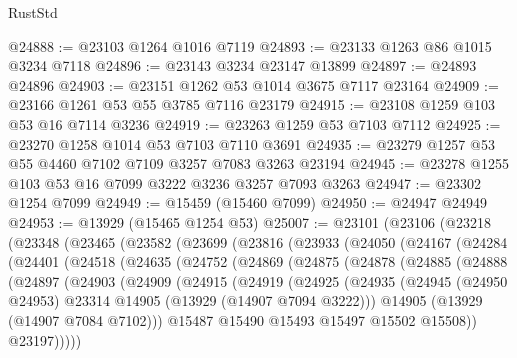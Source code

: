 \begin{lexlean}{RustStd}
\begin{coremodule}
@24888 := @23103 @1264 @1016 @7119
@24893 := @23133 @1263 @86 @1015 @3234 @7118
@24896 := @23143 @3234 @23147 @13899
@24897 := @24893 @24896
@24903 := @23151 @1262 @53 @1014 @3675 @7117 @23164
@24909 := @23166 @1261 @53 @55 @3785 @7116 @23179
@24915 := @23108 @1259 @103 @53 @16 @7114 @3236
@24919 := @23263 @1259 @53 @7103 @7112
@24925 := @23270 @1258 @1014 @53 @7103 @7110 @3691
@24935 := @23279 @1257 @53 @55 @4460 @7102 @7109 @3257 @7083 @3263 @23194
@24945 := @23278 @1255 @103 @53 @16 @7099 @3222 @3236 @3257 @7093 @3263
@24947 := @23302 @1254 @7099
@24949 := @15459 (@15460 @7099)
@24950 := @24947 @24949
@24953 := @13929 (@15465 @1254 @53)
@25007 := @23101
    (@23106
      (@23218
        (@23348
          (@23465
            (@23582
              (@23699
                (@23816
                  (@23933
                    (@24050
                      (@24167
                        (@24284
                          (@24401
                            (@24518
                              (@24635
                                (@24752
                                  (@24869
                                    (@24875
                                      (@24878
                                        (@24885
                                          (@24888
                                            (@24897
                                              (@24903
                                                (@24909
                                                  (@24915
                                                    (@24919
                                                      (@24925
                                                        (@24935
                                                          (@24945
                                                            (@24950 @24953)
                                                            @23314
                                                            @14905
                                                            (@13929 (@14907 @7094 @3222)))
                                                          @14905
                                                          (@13929 (@14907 @7084 @7102)))
                                                        @15487
                                                        @15490
                                                        @15493
                                                        @15497
                                                        @15502
                                                        @15508))
                                                    @23197)))))

\end{coremodule}
\end{lexlean}
